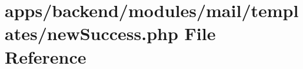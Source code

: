 \hypertarget{backend_2modules_2mail_2templates_2new_success_8php}{\section{apps/backend/modules/mail/templates/new\-Success.php File Reference}
\label{backend_2modules_2mail_2templates_2new_success_8php}
}
